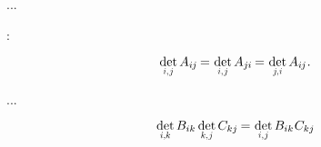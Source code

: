 ...

 :

\nopagebreak\vspace{-0.25em}\begin{equation*}
\underset{\raisebox{.15em}{\scalebox{.7}{$i$,$\hspace{.15ex}j$}}}{\operatorname{det}} \, A_{i\hspace{-0.1ex}j} \hspace{-0.16ex}
= \hspace{.1ex} \underset{\raisebox{.15em}{\scalebox{.7}{$i$,$\hspace{.15ex}j$}}}{\operatorname{det}} \, A_{j\hspace{-0.06ex}i} \hspace{-0.16ex}
= \hspace{.1ex} \underset{\raisebox{.15em}{\scalebox{.7}{$j\hspace{-0.2ex}$,$\hspace{.1ex}i$}}}{\operatorname{det}} \, A_{i\hspace{-0.1ex}j}
\hspace{.1ex} .
\end{equation*}

...


\nopagebreak\vspace{-0.2em}\begin{equation}\label{determinantofmatrixproduct}
\underset{\raisebox{.15em}{\scalebox{.7}{$i$,$k$}}}{\operatorname{det}} \, \somematrixelements{ik} \hspace{.4ex} \underset{\raisebox{.15em}{\scalebox{.7}{$k$,$\hspace{.15ex}j$}}}{\operatorname{det}} \, C_{kj} \hspace{-0.15ex}
= \hspace{.1ex} \underset{\raisebox{.15em}{\scalebox{.7}{$i$,$\hspace{.15ex}j$}}}{\operatorname{det}} \, \somematrixelements{ik} \hspace{.1ex} C_{kj}
\end{equation}

